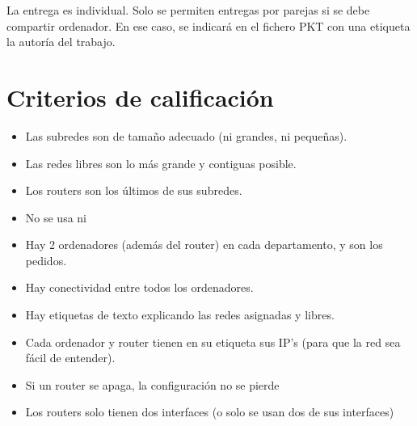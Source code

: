La entrega es individual. Solo se permiten entregas por parejas si se debe compartir ordenador. En ese caso, se indicará en el fichero PKT con una etiqueta la autoría del trabajo.

\section{Criterios de calificación}
\begin{itemize}
\item Las subredes son de tamaño adecuado (ni grandes, ni pequeñas).
\item Las redes libres son lo más grande y contiguas posible.
\item Los routers son los últimos de sus subredes.
\item No se usa \texttt{} ni \texttt{}
\item Hay 2 ordenadores (además del router) en cada departamento, y son los pedidos.
\item Hay conectividad entre todos los ordenadores.
\item Hay etiquetas de texto explicando las redes asignadas y libres.
\item Cada ordenador y router tienen en su etiqueta sus IP’s (para que la red sea fácil de entender).
\item Si un router se apaga, la configuración no se pierde
\item Los routers solo tienen dos interfaces (o solo se usan dos de sus interfaces)
\end{itemize}

